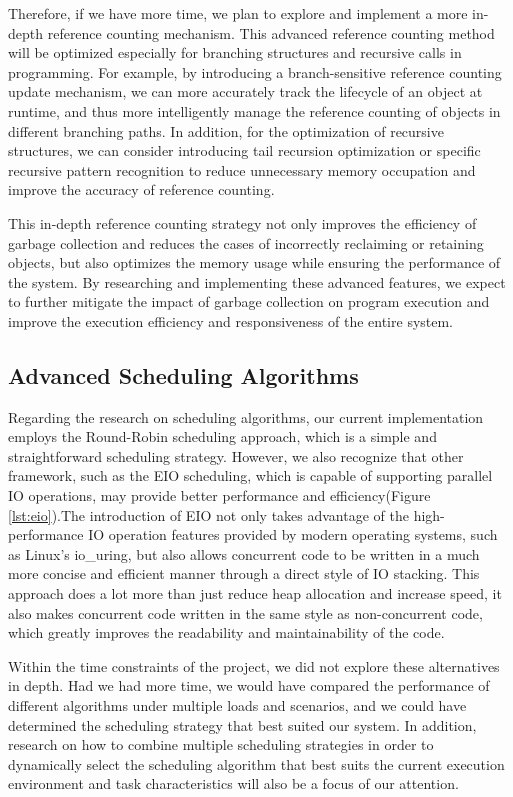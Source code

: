 \documentclass{l4proj}
\begin{document}
Therefore, if we have more time, we plan to explore and implement a more in-depth reference counting mechanism. This advanced reference counting method will be optimized especially for branching structures and recursive calls in programming. For example, by introducing a branch-sensitive reference counting update mechanism, we can more accurately track the lifecycle of an object at runtime, and thus more intelligently manage the reference counting of objects in different branching paths. In addition, for the optimization of recursive structures, we can consider introducing tail recursion optimization or specific recursive pattern recognition to reduce unnecessary memory occupation and improve the accuracy of reference counting.

This in-depth reference counting strategy not only improves the efficiency of garbage collection and reduces the cases of incorrectly reclaiming or retaining objects, but also optimizes the memory usage while ensuring the performance of the system. By researching and implementing these advanced features, we expect to further mitigate the impact of garbage collection on program execution and improve the execution efficiency and responsiveness of the entire system.

\subsection{Advanced Scheduling Algorithms}

Regarding the research on scheduling algorithms, our current implementation employs the Round-Robin scheduling approach, which is a simple and straightforward scheduling strategy. However, we also recognize that other framework, such as the EIO scheduling, which is capable of supporting parallel IO operations, may provide better performance and efficiency(Figure \ref{lst:eio}).The introduction of EIO not only takes advantage of the high-performance IO operation features provided by modern operating systems, such as Linux's io\_uring, but also allows concurrent code to be written in a much more concise and efficient manner through a direct style of IO stacking. This approach does a lot more than just reduce heap allocation and increase speed, it also makes concurrent code written in the same style as non-concurrent code, which greatly improves the readability and maintainability of the code.

Within the time constraints of the project, we did not explore these alternatives in depth. Had we had more time, we would have compared the performance of different algorithms under multiple loads and scenarios, and we could have determined the scheduling strategy that best suited our system. In addition, research on how to combine multiple scheduling strategies in order to dynamically select the scheduling algorithm that best suits the current execution environment and task characteristics will also be a focus of our attention.
\end{document}
